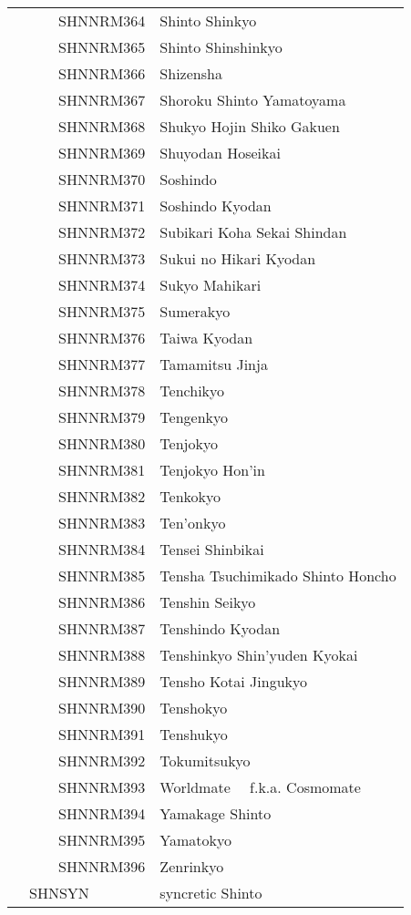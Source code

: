 \documentclass[12pt]{article}
\begin{document}
\begin{tiny}
\begin{center}
\begin{longtable}{|l|l|}
~~~~~~SHNNRM364 & Shinto Shinkyo \\
~~~~~~SHNNRM365 & Shinto Shinshinkyo \\
~~~~~~SHNNRM366 & Shizensha \\
~~~~~~SHNNRM367 & Shoroku Shinto Yamatoyama \\
~~~~~~SHNNRM368 & Shukyo Hojin Shiko Gakuen \\
~~~~~~SHNNRM369 & Shuyodan Hoseikai \\
~~~~~~SHNNRM370 & Soshindo \\
~~~~~~SHNNRM371 & Soshindo Kyodan \\
~~~~~~SHNNRM372 & Subikari Koha Sekai Shindan \\
~~~~~~SHNNRM373 & Sukui no Hikari Kyodan \\
~~~~~~SHNNRM374 & Sukyo Mahikari \\
~~~~~~SHNNRM375 & Sumerakyo \\
~~~~~~SHNNRM376 & Taiwa Kyodan \\
~~~~~~SHNNRM377 & Tamamitsu Jinja \\
~~~~~~SHNNRM378 & Tenchikyo \\
~~~~~~SHNNRM379 & Tengenkyo \\
~~~~~~SHNNRM380 & Tenjokyo \\
~~~~~~SHNNRM381 & Tenjokyo Hon'in \\
~~~~~~SHNNRM382 & Tenkokyo \\
~~~~~~SHNNRM383 & Ten'onkyo \\
~~~~~~SHNNRM384 & Tensei Shinbikai \\
~~~~~~SHNNRM385 & Tensha Tsuchimikado Shinto Honcho \\
~~~~~~SHNNRM386 & Tenshin Seikyo \\
~~~~~~SHNNRM387 & Tenshindo Kyodan \\
~~~~~~SHNNRM388 & Tenshinkyo Shin'yuden Kyokai \\
~~~~~~SHNNRM389 & Tensho Kotai Jingukyo \\
~~~~~~SHNNRM390 & Tenshokyo \\
~~~~~~SHNNRM391 & Tenshukyo \\
~~~~~~SHNNRM392 & Tokumitsukyo \\
~~~~~~SHNNRM393 & Worldmate	~~f.k.a. Cosmomate \\
~~~~~~SHNNRM394 & Yamakage Shinto \\
~~~~~~SHNNRM395 & Yamatokyo \\
~~~~~~SHNNRM396 & Zenrinkyo \\
~~SHNSYN & syncretic Shinto \\

\end{longtable}
\end{center}
\end{tiny}
\end{document}
